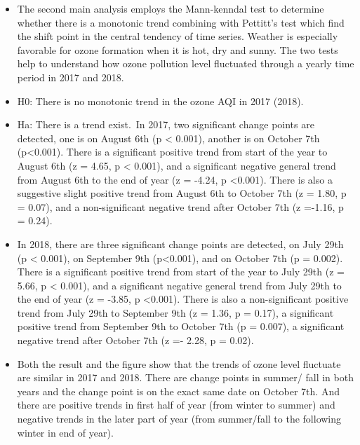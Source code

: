 \documentclass[12pt,]{article}
\begin{document}
\begin{itemize}
\item[]The second main analysis employs the Mann-kenndal test to determine whether there is a monotonic trend combining with Pettitt's test which find the shift point in the central tendency of time series. Weather is especially favorable for ozone formation when it is hot, dry and sunny. The two tests help to understand how ozone pollution level fluctuated through a yearly time period in 2017 and 2018.
\item[]H0: There is no monotonic trend in the ozone AQI in 2017 (2018).  \
\item[]Ha: There is a trend exist.\
 In 2017, two significant change points are detected, one is on August 6th (p < 0.001), another is on October 7th (p<0.001). There is a significant positive trend from start of the year to August 6th (z = 4.65, p < 0.001), and a significant negative general trend from August 6th to the end of year (z = -4.24, p <0.001). There is also a suggestive slight positive trend from August 6th to October 7th (z = 1.80, p = 0.07), and a non-significant negative trend after October 7th (z =-1.16, p = 0.24).
\item[]In 2018, there are three significant change points are detected, on July 29th (p < 0.001), on September 9th (p<0.001), and on October 7th (p = 0.002). There is a significant positive trend from start of the year to July 29th (z = 5.66, p < 0.001), and a significant negative general trend from July 29th to the end of year (z = -3.85, p <0.001). There is also a non-significant positive trend from July 29th to September 9th (z = 1.36, p = 0.17), a significant positive trend from September 9th to October 7th (p = 0.007), a significant negative trend after October 7th (z =- 2.28, p = 0.02).
\item[]Both the result and the figure show that the trends of ozone level fluctuate are similar in 2017 and 2018. There are change points in summer/ fall in both years and the change point is on the exact same date on October 7th. And there are positive trends in first half of year (from winter to summer) and negative trends in the later part of year (from summer/fall to the following winter in end of year).
\end{itemize}
\end{document}
